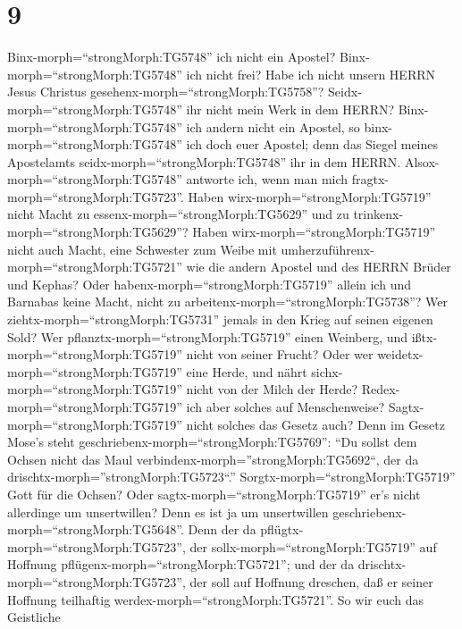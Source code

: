 \hypertarget{section-8}{%
\section{9}\label{section-8}}

 Binx-morph=``strongMorph:TG5748'' ich nicht ein Apostel?
Binx-morph=``strongMorph:TG5748'' ich nicht frei? Habe ich nicht unsern
HERRN Jesus Christus gesehenx-morph=``strongMorph:TG5758''?
Seidx-morph=``strongMorph:TG5748'' ihr nicht mein Werk in dem HERRN?
 Binx-morph=``strongMorph:TG5748'' ich andern nicht ein
Apostel, so binx-morph=``strongMorph:TG5748'' ich doch euer Apostel;
denn das Siegel meines Apostelamts seidx-morph=``strongMorph:TG5748''
ihr in dem HERRN.  Alsox-morph=``strongMorph:TG5748''
antworte ich, wenn man mich fragtx-morph=``strongMorph:TG5723''.
 Haben wirx-morph=``strongMorph:TG5719'' nicht Macht zu
essenx-morph=``strongMorph:TG5629'' und zu
trinkenx-morph=``strongMorph:TG5629''?  Haben
wirx-morph=``strongMorph:TG5719'' nicht auch Macht, eine Schwester zum
Weibe mit umherzuführenx-morph=``strongMorph:TG5721'' wie die andern
Apostel und des HERRN Brüder und Kephas?  Oder
habenx-morph=``strongMorph:TG5719'' allein ich und Barnabas keine Macht,
nicht zu arbeitenx-morph=``strongMorph:TG5738''?  Wer
ziehtx-morph=``strongMorph:TG5731'' jemals in den Krieg auf seinen
eigenen Sold? Wer pflanztx-morph=``strongMorph:TG5719'' einen Weinberg,
und ißtx-morph=``strongMorph:TG5719'' nicht von seiner Frucht? Oder wer
weidetx-morph=``strongMorph:TG5719'' eine Herde, und nährt
sichx-morph=``strongMorph:TG5719'' nicht von der Milch der Herde?
 Redex-morph=``strongMorph:TG5719'' ich aber solches auf
Menschenweise? Sagtx-morph=``strongMorph:TG5719'' nicht solches das
Gesetz auch?  Denn im Gesetz Mose's steht
geschriebenx-morph=``strongMorph:TG5769'': ``Du sollst dem Ochsen nicht
das Maul verbindenx-morph=''strongMorph:TG5692``, der da
drischtx-morph=''strongMorph:TG5723``.''
Sorgtx-morph=``strongMorph:TG5719'' Gott für die Ochsen? 
Oder sagtx-morph=``strongMorph:TG5719'' er's nicht allerdinge um
unsertwillen? Denn es ist ja um unsertwillen
geschriebenx-morph=``strongMorph:TG5648''. Denn der da
pflügtx-morph=``strongMorph:TG5723'', der
sollx-morph=``strongMorph:TG5719'' auf Hoffnung
pflügenx-morph=``strongMorph:TG5721''; und der da
drischtx-morph=``strongMorph:TG5723'', der soll auf Hoffnung dreschen,
daß er seiner Hoffnung teilhaftig werdex-morph=``strongMorph:TG5721''.
 So wir euch das Geistliche
